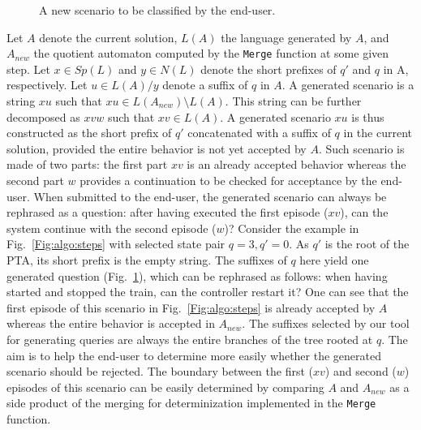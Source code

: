 \begin{description}
\begin{figure}[H]
\centering
{}
\caption{A new scenario to be classified by the end-user\label{Fig:generated:question}.}
\end{figure}

Let $A$ denote the current solution, $L(A)$ the language generated by $A$, and $A_{new}$ the quotient automaton computed by the \texttt{Merge} function at some given step. Let $x \in Sp(L)$ and $y \in N(L)$ denote the short prefixes of $q'$ and $q$ in A, respectively. Let $u \in L(A)/y$ denote a suffix of $q$ in $A$. A generated scenario is a string $xu$ such that $xu \in L(A_{new})\setminus L(A)$. This string can be further decomposed as $xvw$ such that $xv \in L(A)$. A generated scenario $xu$ is thus constructed as the short prefix of $q'$ concatenated with a suffix of $q$ in the current solution, provided the entire behavior is not yet accepted by $A$. Such scenario is made of two parts: the first part $xv$ is an already accepted behavior whereas the second part $w$ provides a continuation to be checked for acceptance by the end-user. When submitted to the end-user, the generated scenario can always be rephrased as a question: after having executed the first episode ($xv$), can the system continue with the second episode ($w$)? Consider the example in Fig.~\ref{Fig:algo:steps} with selected state pair $q=3, q'=0$. As $q'$ is the root of the PTA, its short prefix is the empty string. The suffixes of $q$ here yield one generated question (Fig.~\ref{Fig:generated:question}), which can be rephrased as follows: when having started and stopped the train, can the controller restart it? One can see that the first episode of this scenario in Fig.~\ref{Fig:algo:steps} is already accepted by $A$ whereas the entire behavior is accepted in $A_{new}$. The suffixes selected by our tool for generating queries are always the entire branches of the tree rooted at $q$. The aim is to help the end-user to determine more easily whether the generated scenario should be rejected. The boundary between the first ($xv$) and second ($w$) episodes of this scenario can be easily determined by comparing $A$ and $A_{new}$ as a side product of the merging for determinization implemented in the \texttt{Merge} function.


\end{description}
